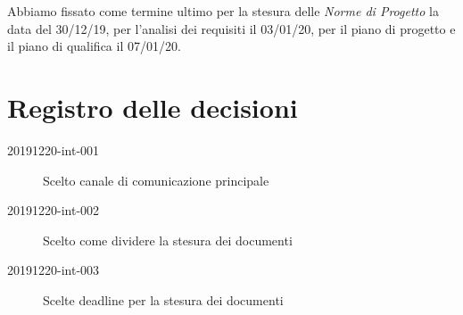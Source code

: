 \documentclass{article}
\begin{document}
Abbiamo fissato come termine ultimo per la stesura delle \textit{Norme di Progetto} la data del 30/12/19, per l'analisi dei requisiti il 03/01/20, per il piano di progetto e il piano di qualifica il 07/01/20.

\newpage
\section{Registro delle decisioni}%
\label{sec:registro_delle_decisioni}

\begin{description}
  \item[20191220-int-001] Scelto canale di comunicazione principale
  \item[20191220-int-002] Scelto come dividere la stesura dei documenti
  \item[20191220-int-003] Scelte deadline per la stesura dei documenti
\end{description}

\end{document}
